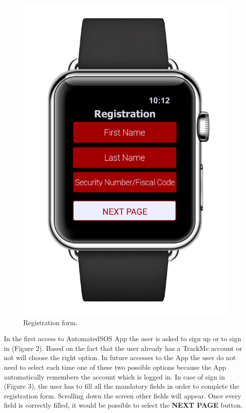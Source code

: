 \begin{enumerate}
\begin{figure}[H]
\begin{center}
\begin{minipage}[c]{.40\textwidth}
          \includegraphics[height=12 cm]{Images/Mockups/AutomatedSOSMockup6.png}
          	\caption{Registration form.}
        \end{minipage}
      \end{center}
\end{figure}
In the first access to AutomatedSOS App the user is asked to sign up or to sign in 			(Figure 2). Based on the fact that the user already has a TrackMe account or not will choose the right option. In future accesses to the App the user do not need to select each time one of these two possible options because the App automatically remembers the account which is logged in. In case of sign in (Figure 3), the user has to fill all the mandatory fields in order to complete the registration form. Scrolling down the screen other fields will appear. Once every field is correctly filled, it would be possible to select the \textbf{NEXT PAGE} button. 
\clearpage
\begin{figure}[H]
\begin{center}
        \begin{minipage}[c]{.40\textwidth}
        \centering

\end{minipage}
\end{center}
\end{figure}
\end{enumerate}
